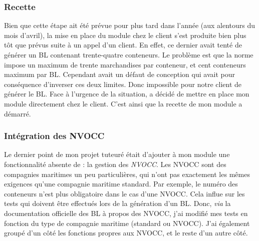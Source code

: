\subsubsection{Recette}
Bien que cette étape ait été prévue pour plus tard dans l'année (aux alentours du mois d'avril), la mise en place du module chez le client s'est produite bien plus tôt que prévus suite à un appel d'un client. En effet, ce dernier avait tenté de générer un BL contenant trente-quatre conteneurs. Le problème est que la norme impose un maximum de trente marchandises par conteneur, et cent conteneurs maximum par BL. Cependant \pireus{} avait un défaut de conception qui avait pour conséquence d'inverser ces deux limites. Donc impossible pour notre client de générer le BL. Face à l'urgence de la situation, \solulog{} a décidé de mettre en place mon module directement chez le client. C'est ainsi que la recette de mon module a démarré.

\subsubsection{Intégration des NVOCC}
Le dernier point de mon projet tuteuré était d'ajouter à mon module une fonctionnalité absente de \pireus{} : la gestion des \emph{NVOCC}. Les NVOCC sont des compagnies maritimes un peu particulières, qui n'ont pas exactement les mêmes exigences qu'une compagnie maritime standard. Par exemple, le numéro des conteneurs n'est plus obligatoire dans le cas d'une NVOCC. Cela influe sur les tests qui doivent être effectués lors de la génération d'un BL. Donc, \emph{via} la documentation officielle des BL à propos des NVOCC, j'ai modifié mes tests en fonction du type de compagnie maritime (standard ou NVOCC). J'ai également groupé d'un côté les fonctions propres aux NVOCC, et le reste d'un autre côté.
